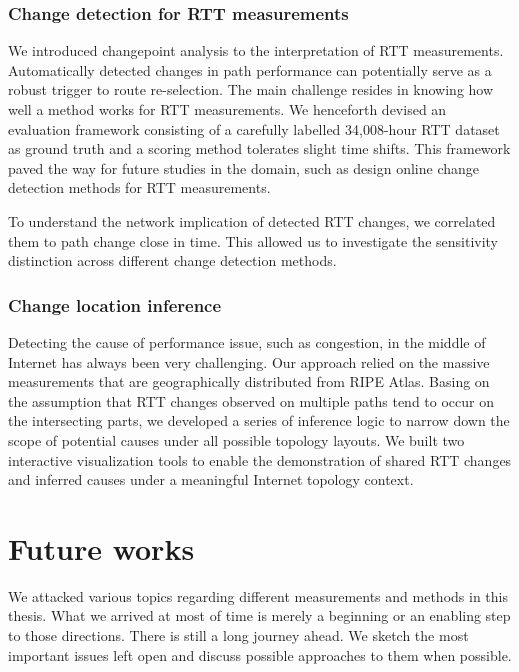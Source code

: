 \subsection{Change detection for RTT measurements}

We introduced changepoint analysis to the interpretation of RTT measurements.
Automatically detected changes in path performance can potentially serve as a robust trigger to route re-selection.
The main challenge resides in knowing how well a method works for RTT measurements.
We henceforth devised an evaluation framework consisting of a carefully labelled 34,008-hour RTT dataset as ground truth and a scoring method tolerates slight time shifts. This framework paved the way for future studies in the domain, such as design online change detection methods for RTT measurements.

To understand the network implication of detected RTT changes, we correlated them to path change close in time.
This allowed us to investigate the sensitivity distinction across different change detection methods.

\subsection{Change location inference}
Detecting the cause of performance issue, such as congestion, in the middle of Internet has always been very challenging. 
Our approach relied on the massive measurements that are geographically distributed from RIPE Atlas. Basing on the assumption that RTT changes observed on multiple paths tend to occur on the intersecting parts, we developed a series of inference logic to narrow down the scope of potential causes under all possible topology layouts.
We built two interactive visualization tools to enable the demonstration of shared RTT changes and inferred causes under a meaningful Internet topology context.


\chapter{Future works}
We attacked various topics regarding different measurements and methods in this thesis.
What we arrived at most of time is merely a beginning or an enabling step to those directions.
There is still a long journey ahead.
We sketch the most important issues left open and discuss possible approaches to them when possible.

